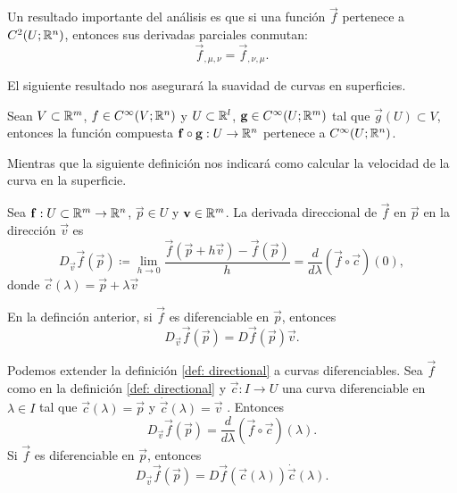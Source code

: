 Un resultado importante del análisis es que si una función $\vec f$ pertenece a $C^2(U; \mathbb R^n)$, entonces sus derivadas parciales conmutan:
\begin{equation}
	\vec f_{,\mu, \nu} = \vec f_{,\nu,\mu}.
\end{equation}

El siguiente resultado nos asegurará la suavidad de curvas en superficies.
\begin{proposition}\label{prop: compSmooth}
	Sean $V \subset \mathbb R^m$, $f \in C^\infty(V; \mathbb R^n)$ y $U \subset \mathbb R^l$, $\mathbf g \in C^\infty(U; \mathbb R^m)$ tal que $\vec g(U) \subset V$, entonces la función compuesta $\mathbf f \circ \mathbf g : U \to \mathbb R^n$ pertenece a $C^\infty(U; \mathbb R^n)$.
\end{proposition}
Mientras que la siguiente definición nos indicará como calcular la velocidad de la curva en la superficie.
\begin{definition}\label{def: directional}
	Sea $\mathbf f: U \subset \mathbb R^m \to \mathbb R^n$, $\vec p \in U$ y $\mathbf v \in \mathbb R^m$. La derivada direccional de $\vec f$ en $\vec p$ en la dirección $\vec v$ es
	\begin{equation}
		D_{\vec v} \vec f(\vec p) \coloneqq \lim_{h \to 0} \frac{\vec f(\vec p + h\vec v) - \vec f(\vec p)}{h} = \frac{d}{d\lambda}(\vec f \circ \vec c)(0),
	\end{equation}
	donde $\vec c(\lambda) = \vec p + \lambda \vec v$
\end{definition}

\begin{proposition}
	En la definción anterior, si $\vec f$ es diferenciable en $\vec p$, entonces
	\begin{equation}
		D_{\vec v} \vec f(\vec p) = D\vec f(\vec p)\vec v.
	\end{equation}
\end{proposition}

\begin{proposition}
	Podemos extender la definición \ref{def: directional} a curvas diferenciables. Sea $\vec f$ como en la definición \ref{def: directional} y $\vec c : I \to U$ una curva diferenciable en $\lambda \in I$ tal que $\vec c(\lambda) = \vec p$ y $\dot{\vec c}(\lambda) = \vec v$ . Entonces
	\begin{equation}
		D_{\vec v} \vec f(\vec p) = \frac{d}{d\lambda}(\vec f \circ \vec c)(\lambda).
	\end{equation}
	Si $\vec f$ es diferenciable en $\vec p$, entonces
	\begin{equation}
		D_{\vec v} \vec f(\vec p) = D\vec f(\vec c(\lambda))\dot{\vec c}(\lambda).
	\end{equation}
\end{proposition}

